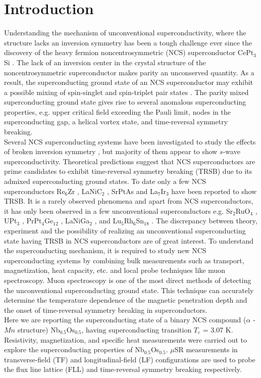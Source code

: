 \documentclass[reprint, superscriptaddress, secnumarabic, amssymb, nobibnotes, aps, prl]{revtex4-1}
\begin{document}
\section{Introduction}
Understanding the mechanism of unconventional superconductivity, where the structure lacks an inversion symmetry has been a tough challenge ever since the discovery of the heavy fermion noncentrosymmetric (NCS) superconductor CePt$_{3}$Si \cite{Bauer2004,EBA}. The lack of an inversion center in the crystal structure of the noncentrosymmetric superconductor makes parity an unconserved quantity. As a result, the superconducting ground state of an NCS superconductor may exhibit a possible mixing of spin-singlet and spin-triplet pair states \cite{rashba,sky,kv,ia,pa,fujimoto1,fujimoto2,fujimoto3,mdf}. The parity mixed superconducting ground state gives rise to several anomalous superconducting properties, e.g. upper critical field exceeding the Pauli limit, nodes in the superconducting gap, a helical vortex state, and time-reversal symmetry breaking.\\
Several NCS superconducting systems have been investigated to study the effects of broken inversion symmetry \cite{nr1,RT1,rf,rhf,rz3,YC,LC,rw,mib,lip,mac1,rg,ig,lrs,lps,rb1}, but majority of them appear to show $\textit{s}$-wave superconductivity. Theoretical predictions suggest that NCS superconductors are prime candidates to exhibit time-reversal symmetry breaking (TRSB) due to its admixed superconducting ground states. To date only a few NCS superconductors Re$_{6}$Zr \cite{rz1}, LaNiC$_{2}$ \cite{lnc2}, SrPtAs \cite{SPA} and La$_{7}$Ir$_{3}$ \cite{li1} have been reported to show TRSB. It is a rarely observed phenomena and apart from NCS superconductors, it has only been observed in a few unconventional superconductors e.g. Sr$_{2}$RuO$_{4}$ \cite{sro1,sro2}, UPt$_{3}$ \cite{UP1,UP2}, PrPt$_{4}$Ge$_{12}$ \cite{ppg}, LaNiGa$_{2}$ \cite{LNG}, and Lu$_{5}$Rh$_{6}$Sn$_{18}$ \cite{LoS}. The discrepancy between theory, experiment and the possibility of realizing an unconventional superconducting state having TRSB in NCS superconductors are of great interest. To understand the superconducting mechanism, it is required to study new NCS superconducting systems by combining bulk measurements such as transport, magnetization, heat capacity, etc. and local probe techniques like muon spectroscopy. Muon spectroscopy is one of the most direct methods of detecting the unconventional superconducting ground state. This technique can accurately determine the temperature dependence of the magnetic penetration depth and the onset of time-reversal symmetry breaking in superconductors.\\
Here we are reporting the superconducting state of a binary NCS compound ($\alpha$ - $Mn$ structure) Nb$_{0.5}$Os$_{0.5}$, having  superconducting transition $T_{c}$ = 3.07 K. Resistivity, magnetization, and specific heat measurements were carried out to explore the superconducting properties of Nb$_{0.5}$Os$_{0.5}$. $\mu$SR measurements in transverse-field (TF) and longitudinal-field (LF) configurations are used to probe the flux line lattice (FLL) and time-reversal symmetry breaking respectively.
\end{document}
